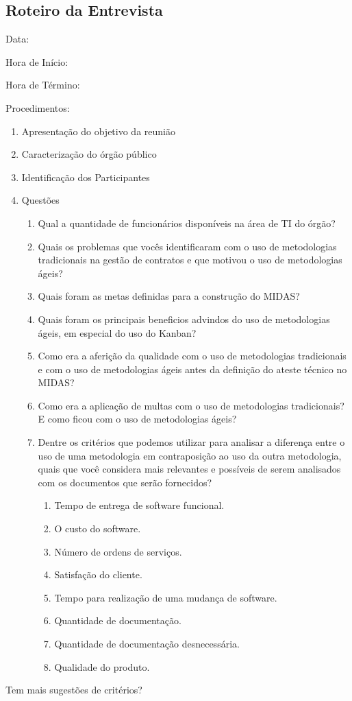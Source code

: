 \begin{apendicesenv}

\partapendices

\chapter{Roteiro da Entrevista}

Data: 

Hora de Início:

Hora de Término:

Procedimentos:

\begin{enumerate}
\item Apresentação do objetivo da reunião
\item Caracterização do órgão público
\item Identificação dos Participantes
\item Questões
\begin{enumerate} 
\item Qual a quantidade de funcionários disponíveis na área de TI do órgão?
\item Quais os problemas que vocês identificaram com o uso de metodologias tradicionais na gestão de contratos e que motivou o uso de metodologias ágeis?
\item Quais foram as metas definidas para a construção do MIDAS?
\item Quais foram os principais beneficios advindos do uso de metodologias ágeis, em especial do uso do Kanban?
\item Como era a aferição da qualidade com o uso de metodologias tradicionais e com o uso de metodologias ágeis antes da definição do ateste técnico no MIDAS?
\item Como era a aplicação de multas com o uso de metodologias tradicionais? E como ficou com o uso de metodologias ágeis?
\item Dentre os critérios que podemos utilizar para analisar a diferença entre o uso de uma metodologia em contraposição ao uso da outra metodologia, quais que você considera mais relevantes e possíveis de serem analisados com os documentos que serão fornecidos?
\begin{enumerate}
\item Tempo de entrega de software funcional.
\item	O custo do software.
\item	Número de ordens de serviços. 
\item	Satisfação do cliente.
\item	Tempo para realização de uma mudança de software.
\item Quantidade de documentação.
\item Quantidade de documentação desnecessária.
\item Qualidade do produto.
\end{enumerate}
\end{enumerate}
\end{enumerate}

Tem mais sugestões de critérios?



\end{apendicesenv}
